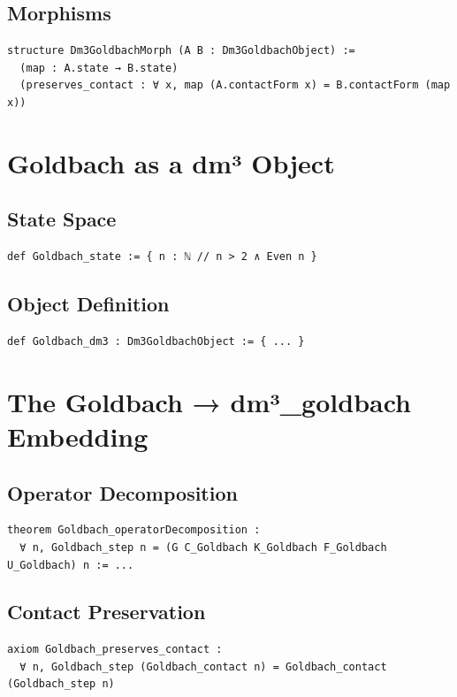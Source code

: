 \documentclass[11pt,a4paper]{article}
\begin{document}
\subsection{Morphisms}
\begin{lstlisting}
structure Dm3GoldbachMorph (A B : Dm3GoldbachObject) :=
  (map : A.state → B.state)
  (preserves_contact : ∀ x, map (A.contactForm x) = B.contactForm (map x))
\end{lstlisting}

\section{Goldbach as a dm³ Object}

\subsection{State Space}
\begin{lstlisting}
def Goldbach_state := { n : ℕ // n > 2 ∧ Even n }
\end{lstlisting}

\subsection{Object Definition}
\begin{lstlisting}
def Goldbach_dm3 : Dm3GoldbachObject := { ... }
\end{lstlisting}

\section{The Goldbach → dm³\_goldbach Embedding}

\subsection{Operator Decomposition}
\begin{lstlisting}
theorem Goldbach_operatorDecomposition :
  ∀ n, Goldbach_step n = (G C_Goldbach K_Goldbach F_Goldbach U_Goldbach) n := ...
\end{lstlisting}

\subsection{Contact Preservation}
\begin{lstlisting}
axiom Goldbach_preserves_contact :
  ∀ n, Goldbach_step (Goldbach_contact n) = Goldbach_contact (Goldbach_step n)
\end{lstlisting}
\end{document}
